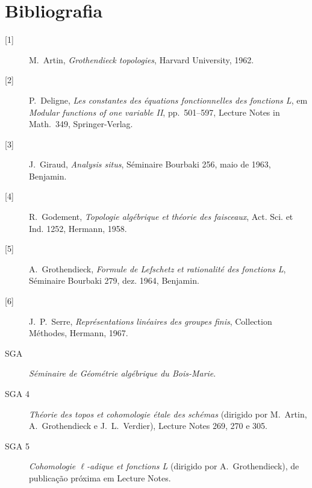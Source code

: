 \section*{Bibliografia}

\begin{description}
\item[{[1]}] M.~Artin, \emph{Grothendieck topologies}, Harvard University,
1962.

\item[{[2]}] P.~Deligne, \emph{Les constantes des équations fonctionnelles
des fonctions L}, em \emph{Modular functions of one variable II},
pp.~501--597, Lecture Notes in Math.~349, Springer-Verlag.

\item[{[3]}] J.~Giraud, \emph{Analysis situs}, Séminaire Bourbaki 256,
maio de 1963, Benjamin.

\item[{[4]}] R.~Godement, \emph{Topologie algébrique et théorie des
faisceaux}, Act. Sci. et Ind. 1252, Hermann, 1958.

\item[{[5]}] A.~Grothendieck, \emph{Formule de Lefschetz et rationalité des
fonctions L}, Séminaire Bourbaki 279, dez. 1964, Benjamin.

\item[{[6]}] J.~P.~Serre, \emph{Représentations linéaires des groupes finis},
Collection Méthodes, Hermann, 1967.
\end{description}

\begin{description}
\item[SGA] \emph{Séminaire de Géométrie algébrique du Bois-Marie}.

\item[SGA 4] \emph{Théorie des topos et cohomologie étale des schémas}
(dirigido por M.~Artin, A.~Grothendieck e J.~L.~Verdier), Lecture Notes 269,
270 e 305.

\item[SGA 5] \emph{Cohomologie $\ell$-adique et fonctions L} (dirigido por
A.~Grothendieck), de publicação próxima em Lecture Notes.
\end{description}
